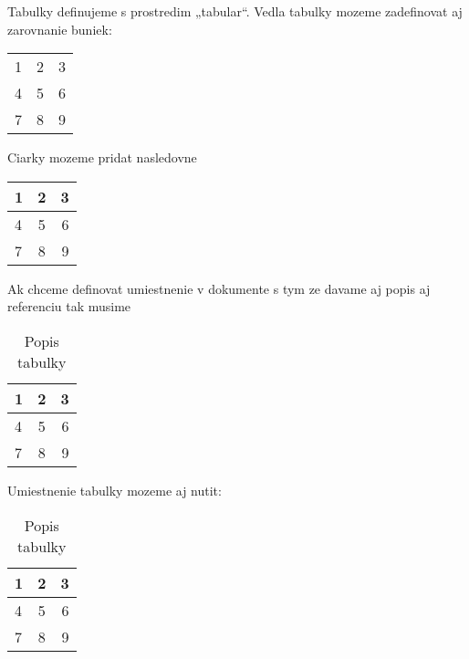 \documentclass{book}
\begin{document}
 

Tabulky definujeme s prostredim „tabular“. Vedla tabulky mozeme zadefinovat aj zarovnanie buniek:

\begin{tabular}{ l c r }
  1 & 2 & 3 \\
  4 & 5 & 6 \\
  7 & 8 & 9 \\
\end{tabular}

Ciarky mozeme pridat nasledovne

\begin{tabular}{| l  | c | r | }
  1 & 2 & 3 \\
  \hline
  4 & 5 & 6 \\
  7 & 8 & 9 \\
\end{tabular}

Ak chceme definovat umiestnenie v dokumente s tym ze davame aj popis aj referenciu tak musime
\begin{table}
\centering
\caption{Popis tabulky}
\begin{tabular}{ l   c  r  }
  1 & 2 & 3 \\
  \hline
  4 & 5 & 6 \\
  7 & 8 & 9 \\
\end{tabular}
\label{mojatabulka}
\end{table}

Umiestnenie tabulky mozeme aj nutit:
\begin{table}[!h]
\centering
\caption{Popis tabulky}
\begin{tabular}{ l   c  r  }
  1 & 2 & 3 \\
  \hline
  4 & 5 & 6 \\
  7 & 8 & 9 \\
\end{tabular}
\label{mojatabulka}
\end{table}
\end{document}
